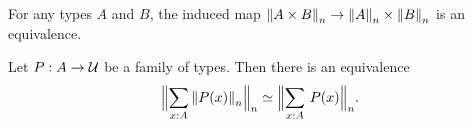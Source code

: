 \documentclass[hott-all.tex]{subfiles}
\begin{document}
% 
% 
\begin{thm}
  For any types $A$ and $B$, the induced map $\trunc n{A\times B} \to \trunc nA \times \trunc nB$ is an equivalence.
\end{thm}
% 
% 
\begin{thm}
Let $P:A\to\type$ be a family of types. Then there is an equivalence
\begin{equation*}
\eqv{\Trunc n{\sm{x:A}\trunc n{P(x)}}}{\Trunc n{\sm{x:A}P(x)}}.
\end{equation*}
\end{thm}
% 
\end{document}
